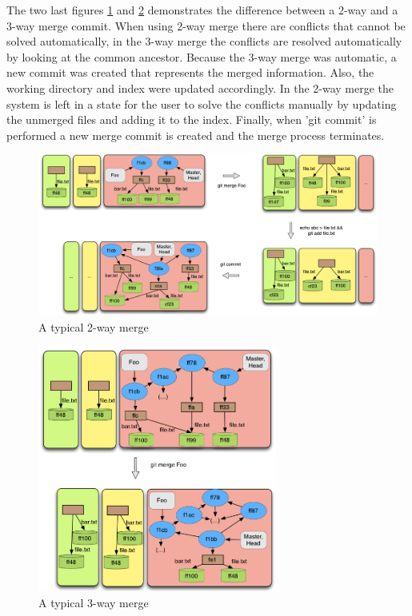 The two last figures \ref{fig:merge2way} and \ref{fig:merge3way} demonstrates 
the difference between a 2-way and a 3-way merge commit. When using
2-way merge there
are conflicts that cannot be solved automatically, in the 3-way merge
the conflicts are resolved automatically by looking at
the common ancestor. Because the 3-way merge was automatic, a new commit was
created that represents the merged information. Also, the working directory and
index were updated accordingly. In the 2-way merge the system is left
in a state for the user to solve the conflicts manually by updating
the unmerged files and adding it to the index.
Finally, when 'git commit' is performed a new merge commit is created and 
the merge process terminates.\\

\begin{figure}[htp]
   \centering
   \includegraphics[width=1.2\textwidth]{images/merge2way}
   \caption{A typical 2-way merge}\label{fig:merge2way}
\end{figure}

\begin{figure}[htp]
   \centering
   \includegraphics[width=0.7\textwidth]{images/merge3way}
   \caption{A typical 3-way merge}\label{fig:merge3way}
\end{figure}

